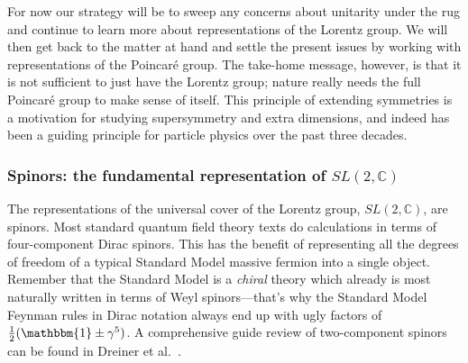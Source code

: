 \documentclass[12pt, oneside]{report}    %
\begin{document}
For now our strategy will be to sweep any concerns about unitarity under the rug and continue to learn more about representations of the Lorentz group. We will then get back to the matter at hand and settle the present issues by working with representations of the Poincar\'e group. The take-home message, however, is that it is not sufficient to just have the Lorentz group; nature really needs the full Poincar\'e group to make sense of itself. This principle of extending symmetries is a motivation for studying supersymmetry and extra dimensions, and indeed has been a guiding principle for particle physics over the past three decades. 

\subsubsection{\texorpdfstring{Spinors: the fundamental representation of $SL(2,\mathbb{C})$}{Spinors: the fundamental representation of SL(2,C)}}
\label{sec:susyalg:repsofsl2c}

The representations of the universal cover of the Lorentz group, $SL(2,\mathbb C)$, are spinors. Most standard quantum field theory texts do calculations in terms of four-component Dirac spinors. This has the benefit of representing all the degrees of freedom of a typical Standard Model massive fermion into a single object. Remember that the Standard Model is a \textit{chiral} theory which already is most naturally written in terms of Weyl spinors---that's why the Standard Model Feynman rules in Dirac notation always end up with ugly factors of $\frac{1}{2}(\mathbbm{1}\pm\gamma^5)$.  A comprehensive guide review of two-component spinors can be found in Dreiner et al.~\autocite{Dreiner:2008tw}.
\end{document}
